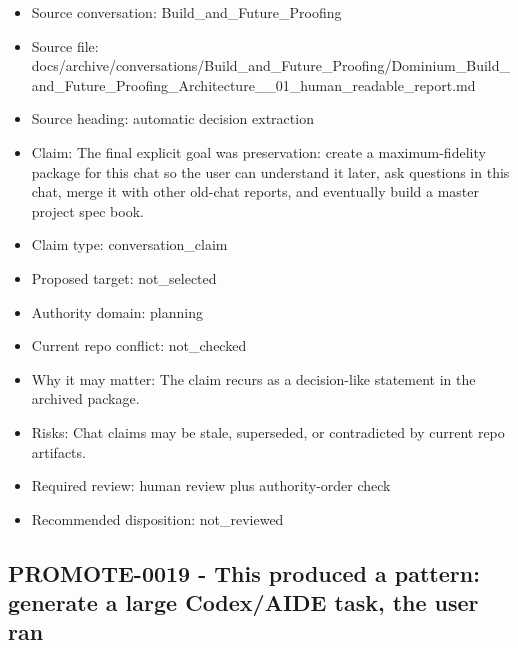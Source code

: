 \documentclass[11pt,a4paper]{report}
\begin{document}
\begin{itemize}
\item Source conversation: Build\_and\_Future\_Proofing
\item Source file: docs/archive/conversations/Build\_and\_Future\_Proofing/Dominium\_Build\_and\_Future\_Proofing\_Architecture\_\_01\_human\_readable\_report.md
\item Source heading: automatic decision extraction
\item Claim: The final explicit goal was preservation: create a maximum-fidelity package for this chat so the user can understand it later, ask questions in this chat, merge it with other old-chat reports, and eventually build a master project spec book.
\item Claim type: conversation\_claim
\item Proposed target: not\_selected
\item Authority domain: planning
\item Current repo conflict: not\_checked
\item Why it may matter: The claim recurs as a decision-like statement in the archived package.
\item Risks: Chat claims may be stale, superseded, or contradicted by current repo artifacts.
\item Required review: human review plus authority-order check
\item Recommended disposition: not\_reviewed
\end{itemize}

\subsection{PROMOTE-0019 - This produced a pattern: generate a large Codex/AIDE task, the user ran}
\end{document}
